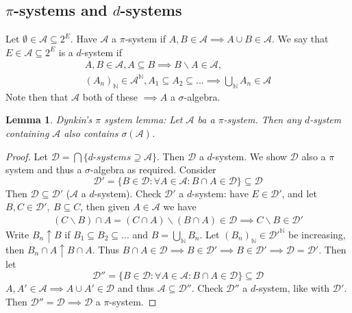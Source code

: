 \documentclass{article}
\newtheorem{lemma}[theorem]{Lemma}
\begin{document}
\subsection{$\pi$-systems and $d$-systems}
Let $\emptyset\in\mathcal{A}\subseteq2^E$. Have $\mathcal{A}$ a $\pi$-system if $A,B\in\mathcal{A}\implies A\cup B\in\mathcal{A}$.  We say that $E\in\mathcal{A}\subseteq2^E$ is a $d$-system if
\begin{align*}
  A,B\in\mathcal{A},A\subseteq B \implies B\backslash A \in \mathcal{A},
  \\
  (A_n)_\mathbb{N}\in\mathcal{A}^\mathbb{N},A_1\subseteq A_2\subseteq ... \implies \bigcup_\mathbb{N}A_n \in \mathcal{A}
\end{align*}
Note then that $\mathcal{A}$ both of these $\implies A$ a $\sigma$-algebra.
\begin{lemma}
  Dynkin's $\pi$ system lemma: Let $\mathcal{A}$ ba a $\pi$-system.  Then any $d$-system containing $\mathcal{A}$ also contains $\sigma(\mathcal{A})$.
\end{lemma}
\begin{proof}
  Let $\mathcal{D}=\bigcap\{d\text{-}systems\supseteq\mathcal{A}\}$.  Then $\mathcal{D}$ a $d$-system.  We show $\mathcal{D}$ also a $\pi$ system and thus a $\sigma$-algebra as required.  Consider
  $$
    \mathcal{D}'=\{B\in\mathcal{D} : \forall A \in \mathcal{A} : B\cap A\in\mathcal{D}\}\subseteq \mathcal{D}
  $$
  Then $\mathcal{D}\subseteq\mathcal{D}'$ ($\mathcal{A}$ a $d$-system).  Check $\mathcal{D}'$ a $d$-system: have $E\in\mathcal{D}'$, and let $B,C\in\mathcal{D}',~B\subseteq C$, then given $A\in\mathcal{A}$ we have
  \begin{align*}
    (C\backslash B)\cap A = (C\cap A)\backslash (B\cap A)\in\mathcal{D}
    \implies C\backslash B \in \mathcal{D}'
  \end{align*}
  Write $B_n \uparrow B$ if $B_1\subseteq B_2\subseteq...$ and $B=\bigcup_\mathbb{N}B_n$.  Let $(B_n)_\mathbb{N}\in\left.\mathcal{D}'\right.^\mathbb{N}$ be increasing, then $B_n\cap A \uparrow B\cap A$.  Thus $B\cap A \in \mathcal{D}\implies B\in\mathcal{D}'\implies B\in \mathcal{D}'\implies \mathcal{D}=\mathcal{D}'$.  Then let
  $$
    \mathcal{D}''=\{B\in\mathcal{D}:\forall A\in\mathcal{A}: B\cap A\in\mathcal{D}\}\subseteq \mathcal{D}
  $$
  $A,A'\in\mathcal{A}\implies A\cup A'\in \mathcal{D}$ and thus $\mathcal{A}\subseteq\mathcal{D}''$.  Check $\mathcal{D}''$ a $d$-system, like with $\mathcal{D}'$.  Then $\mathcal{D}''=\mathcal{D}\implies\mathcal{D}$ a $\pi$-system.
\end{proof}
\end{document}
